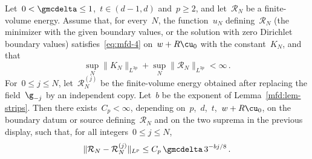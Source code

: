 \documentclass[11pt]{amsart}
\begin{document}
\begin{lemma}
\label{mfd:lem-15}
Let~$0<\gmcdelta\leq1$,~$t\in(d-1,d)$ and~$p\geq2$, and let~$\mathcal R_N$ be a finite-volume energy. Assume that, for every~$N$, the function~$u_N$ defining~$\mathcal R_N$ (the minimizer with the given boundary values, or the solution with zero Dirichlet boundary values) satisfies~\eqref{eq:mfd-4} on~$w+R\cu_0$ with the constant~$K_N$, and that
\begin{equation*}
	\sup_N\|K_N\|_{L^{3p}}+\sup_N\|\mathcal R_N\|_{L^{3p}}<\infty\,.
\end{equation*}
For~$0\leq j\leq N$, let~$\mathcal R_N^{(j)}$ be the finite-volume energy obtained after replacing the field~$\g_{-j}$ by an independent copy. Let~$b$ be the exponent of Lemma~\ref{mfd:lem-strips}. Then there exists~$C_p<\infty$, depending on~$p$,~$d$,~$t$,~$w+R\cu_0$, on the boundary datum or source defining~$\mathcal R_N$ and on the two suprema in the previous display, such that, for all integers~$0\leq j\leq N$,
\begin{equation}
	\|\mathcal R_N-\mathcal R_N^{(j)}\|_{L^p}\leq C_p\,\gmcdelta\,3^{-bj/8}\,.
	\label{eq:mfd-15}
\end{equation}
\end{lemma}
\end{document}
